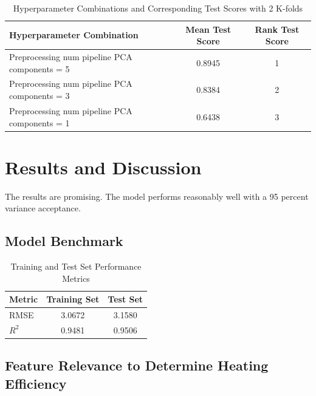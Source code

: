 \documentclass{article}
\begin{document}
\begin{table}[h!]
    \centering
    \caption{Hyperparameter Combinations and Corresponding Test Scores with 2 K-folds}
    \label{tab:hyperparam_scores}
    \begin{tabular}{lcc}
    \toprule
    \textbf{Hyperparameter Combination} & \textbf{Mean Test Score} & \textbf{Rank Test Score} \\
    \midrule
    Preprocessing num pipeline PCA components = 5 & 0.8945 & 1 \\
    Preprocessing num pipeline PCA components = 3 & 0.8384 & 2 \\
    Preprocessing num pipeline PCA components = 1 & 0.6438 & 3 \\
    \bottomrule
    \end{tabular}
\end{table}

\section{Results and Discussion}

The results are promising. The model performs reasonably well with a 95 percent variance acceptance.

\subsection{Model Benchmark}

\begin{table}[h!]
    \centering
    \caption{Training and Test Set Performance Metrics}
    \label{tab:performance_metrics}
    \renewcommand{\arraystretch}{1.2} %
    \begin{tabular}{lcc}
        \toprule
        \textbf{Metric} & \textbf{Training Set} & \textbf{Test Set} \\
        \midrule
        RMSE            & 3.0672               & 3.1580           \\
        \( R^2 \)       & 0.9481               & 0.9506           \\
        \bottomrule
    \end{tabular}
\end{table}

\subsection{Feature Relevance to Determine Heating Efficiency}
\end{document}
